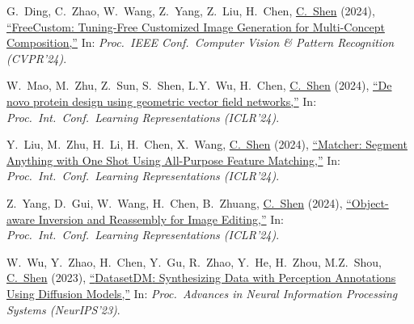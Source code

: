 \documentclass[9pt, a4paper]{article}
\newcommand{\years}[1]{\marginnote{\scriptsize #1}}
\def\highlight{\uline}
\begin{document}
\medskip

\years{2024} G.~Ding, C.~Zhao, W.~Wang, Z.~Yang, Z.~Liu, H.~Chen, \highlight{C.~Shen} (2024),
\href{http://www.google.com/search?lr=&ie=UTF-8&oe=UTF-8&q=FreeCustom%3A+Tuning-Free+Customized+Image+Generation+for+Multi-Concept+Composition+Ganggui+Ding%2C+Canyu+Zhao%2C+Wen+Wang%2C+Zhen+Yang%2C+Zide+Liu%2C+Hao+Chen%2C+Chunhua+Shen}{``{FreeCustom}: Tuning-Free Customized Image Generation for Multi-Concept Composition,{}''}
In: \emph{Proc.\ IEEE Conf.\  Computer Vision \& Pattern Recognition (CVPR'24)}.

\medskip

\years{2024} W.~Mao, M.~Zhu, Z.~Sun, S.~Shen, L.Y.~Wu, H.~Chen, \highlight{C.~Shen} (2024),
\href{http://www.google.com/search?lr=&ie=UTF-8&oe=UTF-8&q=De+novo+protein+design+using+geometric+vector+field+networks+Weian+Mao%2C+Muzhi+Zhu%2C+Zheng+Sun%2C+Shuaike+Shen%2C+Lin+Yuanbo+Wu%2C+Hao+Chen%2C+Chunhua+Shen}{``De novo protein design using geometric vector field networks,{}''}
In: \emph{Proc.\ Int.\ Conf.\  Learning Representations (ICLR'24)}.

\medskip

\years{2024} Y.~Liu, M.~Zhu, H.~Li, H.~Chen, X.~Wang, \highlight{C.~Shen} (2024),
\href{http://www.google.com/search?lr=&ie=UTF-8&oe=UTF-8&q=Matcher%3A+Segment+Anything+with+One+Shot+Using+All-Purpose+Feature+Matching+Yang+Liu%2C+Muzhi+Zhu%2C+Hengtao+Li%2C+Hao+Chen%2C+Xinlong+Wang%2C+Chunhua+Shen}{``Matcher: Segment Anything with One Shot Using All-Purpose Feature Matching,{}''}
In: \emph{Proc.\ Int.\ Conf.\  Learning Representations (ICLR'24)}.

\medskip

\years{2024} Z.~Yang, D.~Gui, W.~Wang, H.~Chen, B.~Zhuang, \highlight{C.~Shen} (2024),
\href{http://www.google.com/search?lr=&ie=UTF-8&oe=UTF-8&q=Object-aware+Inversion+and+Reassembly+for+Image+Editing+Zhen+Yang%2C+Dinggang+Gui%2C+Wen+Wang%2C+Hao+Chen%2C+Bohan+Zhuang%2C+Chunhua+Shen}{``Object-aware Inversion and Reassembly for Image Editing,{}''}
In: \emph{Proc.\ Int.\ Conf.\  Learning Representations (ICLR'24)}.

\medskip

\years{2023} W.~Wu, Y.~Zhao, H.~Chen, Y.~Gu, R.~Zhao, Y.~He, H.~Zhou, M.Z.~Shou, \highlight{C.~Shen} (2023),
\href{http://www.google.com/search?lr=&ie=UTF-8&oe=UTF-8&q=DatasetDM%3A+Synthesizing+Data+with+Perception+Annotations+Using+Diffusion+Models+Weijia+Wu%2C+Yuzhong+Zhao%2C+Hao+Chen%2C+Yuchao+Gu%2C+Rui+Zhao%2C+Yefei+He%2C+Hong+Zhou%2C+Mike+Zheng+Shou%2C+Chunhua+Shen}{``{DatasetDM}: Synthesizing Data with Perception Annotations Using Diffusion Models,{}''}
In: \emph{Proc.\ Advances in Neural Information Processing Systems (NeurIPS'23)}.
\end{document}
